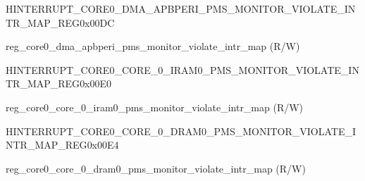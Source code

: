 \begin{register}{H}{INTERRUPT\_CORE0\_DMA\_APBPERI\_PMS\_MONITOR\_VIOLATE\_INTR\_MAP\_REG}{0x00DC}\label{regdesc:INTERRUPTCORE0DMAAPBPERIPMSMONITORVIOLATEINTRMAPREG}
%
%
\regnewline%
\begin{regdesc}\begin{reglist}
\label{fielddesc:INTERRUPTCORE0DMAAPBPERIPMSMONITORVIOLATEINTRMAP}\item [INTERRUPT\_CORE0\_DMA\_APBPERI\_PMS\_MONITOR\_VIOLATE\_INTR\_MAP] reg\_core0\_dma\_apbperi\_pms\_monitor\_violate\_intr\_map (R/W)
\end{reglist}\end{regdesc}
\end{register}


\begin{register}{H}{INTERRUPT\_CORE0\_CORE\_0\_IRAM0\_PMS\_MONITOR\_VIOLATE\_INTR\_MAP\_REG}{0x00E0}\label{regdesc:INTERRUPTCORE0CORE0IRAM0PMSMONITORVIOLATEINTRMAPREG}
%
%
\regnewline%
\begin{regdesc}\begin{reglist}
\label{fielddesc:INTERRUPTCORE0CORE0IRAM0PMSMONITORVIOLATEINTRMAP}\item [INTERRUPT\_CORE0\_CORE\_0\_IRAM0\_PMS\_MONITOR\_VIOLATE\_INTR\_MAP] reg\_core0\_core\_0\_iram0\_pms\_monitor\_violate\_intr\_map (R/W)
\end{reglist}\end{regdesc}
\end{register}


\begin{register}{H}{INTERRUPT\_CORE0\_CORE\_0\_DRAM0\_PMS\_MONITOR\_VIOLATE\_INTR\_MAP\_REG}{0x00E4}\label{regdesc:INTERRUPTCORE0CORE0DRAM0PMSMONITORVIOLATEINTRMAPREG}
%
%
\regnewline%
\begin{regdesc}\begin{reglist}
\label{fielddesc:INTERRUPTCORE0CORE0DRAM0PMSMONITORVIOLATEINTRMAP}\item [INTERRUPT\_CORE0\_CORE\_0\_DRAM0\_PMS\_MONITOR\_VIOLATE\_INTR\_MAP] reg\_core0\_core\_0\_dram0\_pms\_monitor\_violate\_intr\_map (R/W)
\end{reglist}\end{regdesc}
\end{register}


